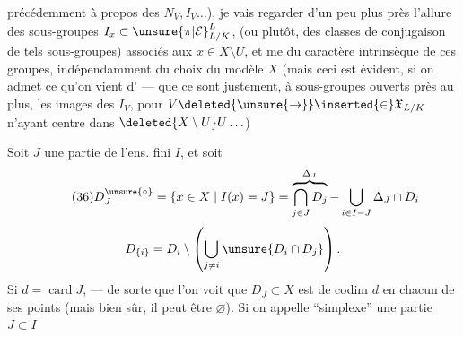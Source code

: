 
précédemment à propos des $N_V,I_V\ldots$), je vais regarder d'un peu plus près l'allure des sous-groupes $I_x\subset\unsure{\pi|\mathcal E}_{L/K}^{\bar L}$, (ou  plutôt, des classes de \inserted{$\pi$-}conjugaison de tels sous-groupes) associés aux $x\in X\setminus U$,  et me  du caractère intrinsèque de ces groupes, indépendamment du choix du modèle $X$ (mais ceci est évident, si on admet ce qu'on vient d' --- que ce sont justement, à sous-groupes ouverts près  au plus, les images des $I_V$, pour $V\deleted{\unsure{\to}}\inserted{\in}\mathfrak X_{L/K}$ n'ayant  centre dans $\deleted{X\setminus U}U\ldots$)


Soit $J$ une partie de l'ens. fini $I$, et soit
\[
\tag{36}
D_J^{\unsure{\circ}}=\{x\in X\mid I(x)=J\}
=\overbrace{\bigcap_{j\in J}D_j}^{\Delta_J}-\bigcup_{i\in I-J}\Delta_J\cap D_i
\]
\[
D_{\{i\}}=D_i\setminus\left(\bigcup_{j\ne i}\unsure{D_i\cap D_j}\right).
\]
Si $d=\operatorname{card}J$, --- de sorte que l'on voit que $D_J\subset X$ est  de codim $d$ en chacun de ses points (mais bien sûr, il peut être $\varnothing$). Si on appelle ``simplexe'' une partie $J\subset I$


